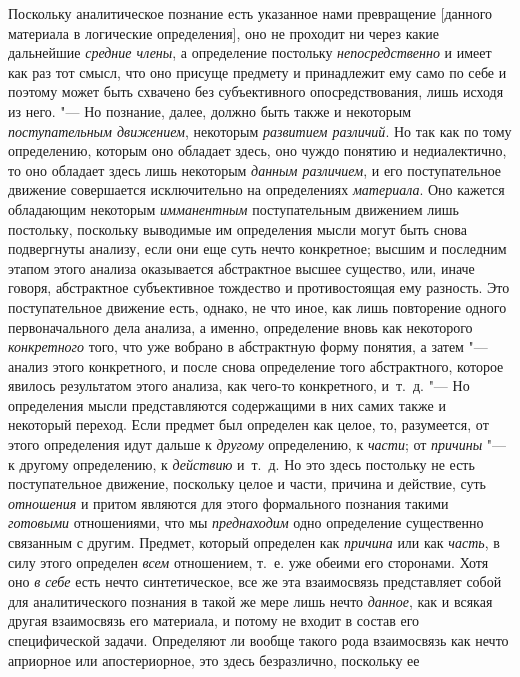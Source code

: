 {{Поскольку аналитическое познание есть указанное нами
превращение [данного материала в логические определения], оно не проходит
ни через какие дальнейшие {\em средние
члены}, а определение постольку
{\em непосредственно} и
имеет как раз тот смысл, что оно присуще предмету и принадлежит ему само по
себе и поэтому может быть схвачено без субъективного опосредствования, лишь
исходя из него. "--- Но познание, далее, должно быть также и
некоторым {\em поступательным
движением}, некоторым
{\em развитием различий}.
Но так как по тому определению, которым оно обладает здесь,
оно чуждо понятию и недиалектично, то оно обладает здесь лишь некоторым
{\em данным различием}, и
его поступательное движение совершается исключительно на определениях
{\em материала}. Оно
кажется обладающим некоторым
{\em имманентным}
поступательным движением лишь постольку, поскольку выводимые
им определения мысли могут быть снова подвергнуты анализу, если они еще
суть нечто конкретное; высшим и последним этапом этого анализа оказывается
абстрактное высшее существо, или, иначе говоря, абстрактное субъективное
тождество и противостоящая ему разность. Это поступательное движение есть,
однако, не что иное, как лишь повторение одного первоначального дела
анализа, а именно, определение вновь как некоторого
{\em конкретного} того,
что уже вобрано в абстрактную форму понятия, а затем
"--- анализ этого конкретного, и после снова определение того
абстрактного, которое явилось результатом этого анализа, как чего-то
конкретного, и~т.~д. "--- Но определения мысли
представляются содержащими в них самих также и некоторый
переход. Если предмет был определен как целое, то, разумеется, от этого
определения идут дальше к {\em другому}
определению, к
{\em части}; от
{\em причины} "--- к другому
определению, к {\em действию}
и~т.~д. Но это здесь постольку не есть поступательное
движение, поскольку целое и части, причина и действие, суть
{\em отношения} и притом
являются для этого формального познания такими
{\em готовыми}
отношениями, что мы
{\em преднаходим} одно
определение существенно связанным с другим. Предмет, который определен как
{\em причина} или как
{\em часть}, в силу этого
определен {\em всем}
отношением, т.~е. уже обеими его сторонами. Хотя оно
{\em в себе} есть нечто
синтетическое, все же эта взаимосвязь представляет собой для аналитического
познания в такой же мере лишь нечто
{\em данное}, как и
всякая другая взаимосвязь его материала, и потому не входит в состав его
специфической задачи. Определяют ли вообще такого рода взаимосвязь как
нечто априорное или апостериорное, это здесь безразлично, поскольку ее
}}
